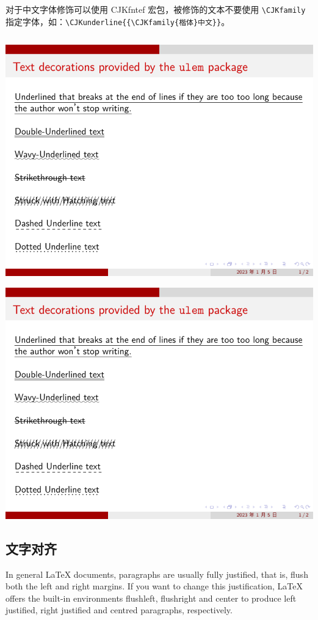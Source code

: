 对于中文字体修饰可以使用 CJKfntef 宏包，被修饰的文本不要使用 \verb|\CJKfamily| 指定字体，如：\verb|\CJKunderline{{\CJKfamily{楷体}中文}}|。

\inputminted[linenos=true]{latex}{examples/beamer/text-decorations.tex}

\includegraphics[page=1]{examples/beamer/text-decorations.pdf}

\includegraphics[page=2]{examples/beamer/text-decorations.pdf}

\subsection{文字对齐}

In general LaTeX documents, paragraphs are usually fully justified, that is, flush both the left and right margins. If you want to change this justification, LaTeX offers the built-in environments flushleft, flushright and center to produce left justified, right justified and centred paragraphs, respectively.


